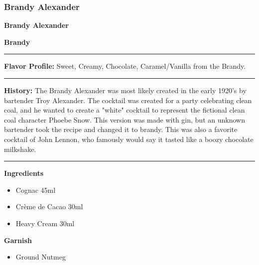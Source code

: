 \subsubsection{Brandy Alexander}
\noindent
\begin{minipage}{.48\textwidth}
    \noindent\textbf{\LARGE Brandy Alexander}
\end{minipage}
\hspace{.02\textwidth}
\begin{minipage}{.48\textwidth}
    \raggedleft
    \textbf{\large Brandy}\\
\end{minipage}
\vspace{.5em}\hrule\vspace{.5em}
\noindent
\textbf{\large Flavor Profile:} Sweet, Creamy, Chocolate, Caramel/Vanilla from the Brandy.
\vspace{.5em}\hrule\vspace{.5em}
\noindent
\textbf{\large History:} The Brandy Alexander was most likely created in the early 1920's by bartender Troy Alexander. The cocktail was created for a party celebrating clean coal, and he wanted to create a "white" cocktail to represent the fictional clean coal character Phoebe Snow. This version was made with gin, but an unknown bartender took the recipe and changed it to brandy. This was also a favorite cocktail of John Lennon, who famously would say it tasted like a boozy chocolate milkshake.
\vspace{.5em}\hrule\vspace{.5em}
\noindent
\begin{minipage}[t]{.48\textwidth}
    \noindent
    \textbf{\large Ingredients}
    \begin{itemize}
        \item Cognac 45ml
        \item Crème de Cacao 30ml
        \item Heavy Cream 30ml
    \end{itemize}
    \noindent
    \textbf{\large Garnish}
    \begin{itemize}
        \item Ground Nutmeg
    \end{itemize}
\end{minipage}

